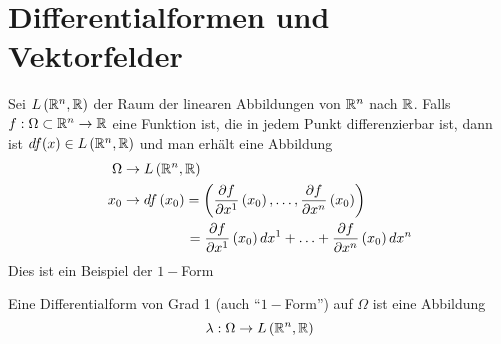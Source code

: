 \section{Differentialformen und Vektorfelder}
Sei $L\left(\mathbb{R}^n,\mathbb{R}\right)$ der Raum der linearen Abbildungen von $\mathbb{R}^n$ nach $\mathbb{R}$. Falls $f:\Omega\subset\mathbb{R}^n\to\mathbb{R}$ eine Funktion ist, die in jedem Punkt differenzierbar ist, dann ist $df(x)\in L\left(\mathbb{R}^n,\mathbb{R}\right)$ und man erhält eine Abbildung
\begin{align*}
\Omega &\to L\left(\R^n,\R\right)\\
x_0 &\to df\left(x_0\right) = \left( {\frac{{\partial f}}{{\partial {x^1}}}\left( {{x_0}} \right), \ldots ,\frac{{\partial f}}{{\partial {x^n}}}\left( {{x_0}} \right)} \right)\\
& \hspace{16mm}=  \frac{{\partial f}}{{\partial {x^1}}}\left( {{x_0}} \right)d{x^1} +  \ldots  + \frac{{\partial f}}{{\partial {x^n}}}\left( {{x_0}} \right)d{x^n}
\end{align*}
Dies ist ein Beispiel der $1-$Form

\begin{definition}{8.26}
Eine Differentialform von Grad 1 (auch ``$1-$Form'') auf $\Omega$ ist eine Abbildung \[\lambda :\Omega\to L\left(\mathbb{R}^n,\mathbb{R}\right)\]
\end{definition}
